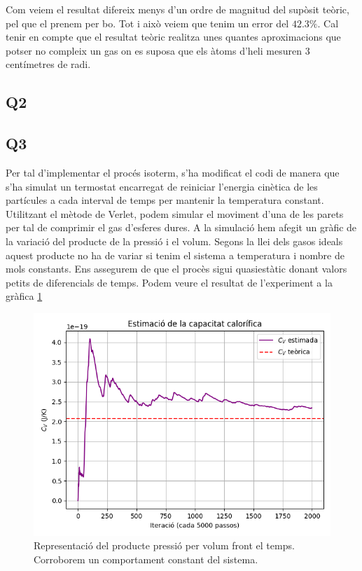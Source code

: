 \documentclass{article}
\begin{document}
	Com veiem el resultat difereix menys d'un ordre de magnitud del supòsit teòric, pel que el prenem per bo. Tot i això veiem que tenim un error del $42.3\%$. Cal tenir en compte que el resultat teòric realitza unes quantes aproximacions que potser no compleix un gas on es suposa que els àtoms d'heli mesuren $3$ centímetres de radi. 
	
	
	\subsection*{Q2}
	
	
	
	\subsection*{Q3}
	Per tal d'implementar el procés isoterm, s'ha modificat el codi de manera que s'ha simulat un termostat encarregat de reiniciar l'energia cinètica de les partícules a cada interval de temps per mantenir la temperatura constant. Utilitzant el mètode de Verlet, podem simular el moviment d'una de les parets per tal de comprimir el gas d'esferes dures. A la simulació hem afegit un gràfic de la variació del producte de la pressió i el volum. Segons la llei dels gasos ideals aquest producte no ha de variar si tenim el sistema a temperatura i nombre de mols constants. Ens assegurem de que el procès sigui quasiestàtic donant valors petits de diferencials de temps. Podem veure el resultat de l'experiment a la gràfica \ref{cacafuti}
	
	\begin{figure}[h!]
		\centering
		\includegraphics[width=0.7\linewidth]{MonteCarlo.png}
		\caption{Representació del producte pressió per volum front el temps. Corroborem un comportament constant del sistema.}
		\label{cacafuti}
	\end{figure}
	
\end{document}
